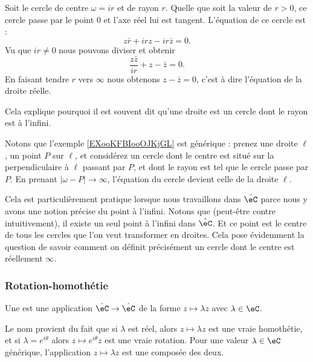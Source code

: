 \begin{example}      \label{EXooKFBIooOJKjGL}
    Soit le cercle de centre \( \omega=ir\) et de rayon \( r\). Quelle que soit la valeur de \( r>0\), ce cercle passe par le point \( 0\) et l'axe réel lui est tangent. L'équation de ce cercle est :
    \begin{equation}
        z\bar r+irz-ir\bar z=0.
    \end{equation}
    Vu que \( ir\neq 0\) nous pouvons diviser et obtenir
    \begin{equation}
        \frac{ z\bar z }{ ir }+z-\bar z=0.
    \end{equation}
    En faisant tendre \( r\) vers \( \infty\) nous obtenons \( z-\bar z=0\), c'est à dire l'équation de la droite réelle.

    Cela explique pourquoi il est souvent dit qu'une droite est un cercle dont le rayon est à l'infini.
\end{example}

\begin{normaltext}\label{NORMooCXVJooMTMqEU}
Notons que l'exemple \ref{EXooKFBIooOJKjGL} est générique : prenez une droite \( \ell\), un point \( P\) sur \( \ell\), et considérez un cercle dont le centre est situé sur la perpendiculaire à \( \ell\) passant par \( P\), et dont le rayon est tel que le cercle passe par \( P\). En prenant \( | \omega-P |\to \infty\), l'équation du cercle devient celle de la droite \( \ell\).

Cela est particulièrement pratique lorsque nous travaillons dans \( \hat \eC\) parce nous y avons une notion précise du point à l'infini. Notons que (peut-être contre intuitivement), il existe un seul point à l'infini dans \( \hat \eC\). Et ce point est le centre de tous les cercles que l'on veut transformer en droites. Cela pose évidemment la question de savoir comment on définit précisément un cercle dont le centre est réellement \( \infty\).
\end{normaltext}

\subsubsection{Rotation-homothétie}

\begin{definition}
    Une  est une application \(  \hat \eC \to \hat \eC\) de la forme \( z\mapsto \lambda z\) avec \( \lambda\in \eC\).
\end{definition}
Le nom provient du fait que si \( \lambda\) est réel, alors \( z\mapsto \lambda z\) est une vraie homothétie, et si \( \lambda= e^{i\theta}\) alors \( z\mapsto  e^{i\theta}z\) est une vraie rotation. Pour une valeur \( \lambda\in \eC\) générique, l'application \( z\mapsto \lambda z\) est une composée des deux.

